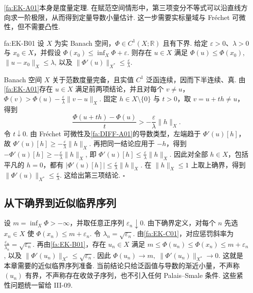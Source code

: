 \autoref{fa:EK-A01}本身是度量定理. 在赋范空间情形中，第三项变分不等式可以沿直线方向求一阶极限，从而得到定量导数小量估计. 这一步需要实标量域与 Fréchet 可微性，但不需要凸性.

\begin{FATheorem}{fa:EK-B01}
设 \(\displaystyle X\) 为实 Banach 空间，\(\displaystyle\Phi\in C^1(X;\mathbb R)\) 且有下界. 给定 \(\displaystyle\varepsilon>0\)、\(\displaystyle\lambda>0\) 与 \(\displaystyle x_0\in X\)，并假设
\(\displaystyle \Phi(x_0) \leqslant \inf_X\Phi+\varepsilon\).
则存在 \(\displaystyle u\in X\) 满足
\(\displaystyle \Phi(u) \leqslant \Phi(x_0)\),
\(\displaystyle \|u-x_0\|_X \leqslant \lambda\),
以及
\(\displaystyle \|\Phi'(u)\|_{X^*} \leqslant \frac{\varepsilon}{\lambda}\).
\end{FATheorem}

\begin{FAProof}
Banach 空间 \(\displaystyle X\) 关于范数度量完备，且实值 \(\displaystyle C^1\) 泛函连续，因而下半连续、真. 由\autoref{fa:EK-A01}存在 \(\displaystyle u\in X\) 满足前两项结论，并且对每个 \(\displaystyle v\neq u\)，
\(\displaystyle \Phi(v) > \Phi(u)- \frac{\varepsilon}{\lambda}\|v-u\|_X\).
固定 \(\displaystyle h\in X\setminus\{0\}\) 与 \(\displaystyle t>0\)，取 \(\displaystyle v=u+th\neq u\)，得到
\[
\frac{\Phi(u+th)-\Phi(u)}{t}
>
-
\frac{\varepsilon}{\lambda}\|h\|_X.
\]
令 \(\displaystyle t\downarrow0\). 由 Fréchet 可微性及\autoref{fa:DIFF-A01}的导数类型，左端趋于 \(\displaystyle\Phi'(u)[h]\)，故
\(\displaystyle \Phi'(u)[h] \geqslant - \frac{\varepsilon}{\lambda}\|h\|_X\).
再把同一结论应用于 \(\displaystyle-h\)，得到
\(\displaystyle -\Phi'(u)[h] \geqslant - \frac{\varepsilon}{\lambda}\|h\|_X\),
即 \(\displaystyle\Phi'(u)[h]\leqslant\frac{\varepsilon}{\lambda}\|h\|_X\). 因此对全部 \(\displaystyle h\in X\)，包括平凡的 \(\displaystyle h=0\)，都有
\(\displaystyle |\Phi'(u)[h]| \leqslant \frac{\varepsilon}{\lambda}\|h\|_X\).
在 \(\displaystyle\|h\|_X\leqslant1\) 上取上确界，得到
\(\displaystyle \|\Phi'(u)\|_{X^*} \leqslant \frac{\varepsilon}{\lambda}\).
这给出第三项结论.
\hfill\(\square\)
\end{FAProof}

\subsection{从下确界到近似临界序列}

设 \(\displaystyle m=\inf_X\Phi> -\infty\)，并取任意正序列 \(\displaystyle\varepsilon_n\downarrow0\). 由下确界定义，对每个 \(\displaystyle n\) 先选 \(\displaystyle x_n\in X\) 使
\(\displaystyle \Phi(x_n) \leqslant m+\varepsilon_n\).
令 \(\displaystyle\lambda_n=\sqrt{\varepsilon_n}\). 由\autoref{fa:EK-C01}，对应惩罚斜率为 \(\displaystyle\frac{\varepsilon_n}{\lambda_n}=\sqrt{\varepsilon_n}\). 再由\autoref{fa:EK-B01}，存在 \(\displaystyle u_n\in X\) 满足
\(\displaystyle m \leqslant \Phi(u_n) \leqslant \Phi(x_n) \leqslant m+\varepsilon_n\),
以及
\(\displaystyle \|\Phi'(u_n)\|_{X^*} \leqslant \sqrt{\varepsilon_n}\).
因此
\(\displaystyle \Phi(u_n)\to m, \; \|\Phi'(u_n)\|_{X^*}\to0\).
这就是本章需要的近似临界序列准备. 当前结论只给泛函值与导数的渐近小量，不声称 \(\displaystyle(u_n)\) 有界，不声称存在收敛子序列，也不引入任何 Palais--Smale 条件. 这些紧性问题统一留给 III-09.

